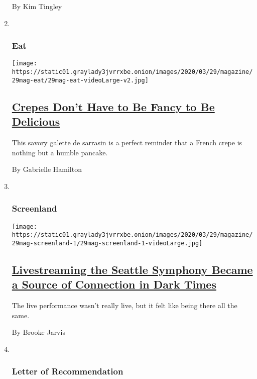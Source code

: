 \begin{enumerate}
  By Kim Tingley
\item ~
  \hypertarget{eat}{%
  \subsubsection{Eat}\label{eat}}

  \texttt{[image: https://static01.graylady3jvrrxbe.onion/images/2020/03/29/magazine/29mag-eat/29mag-eat-videoLarge-v2.jpg]}

  \hypertarget{crepes-dont-have-to-be-fancy-to-be-delicious}{%
  \subsection{\texorpdfstring{\href{/2020/03/25/magazine/crepes-dont-have-to-be-fancy-to-be-delicious.html}{Crepes
  Don't Have to Be Fancy to Be
  Delicious}}{Crepes Don't Have to Be Fancy to Be Delicious}}\label{crepes-dont-have-to-be-fancy-to-be-delicious}}

  This savory galette de sarrasin is a perfect reminder that a French
  crepe is nothing but a humble pancake.

  By Gabrielle Hamilton
\item ~
  \hypertarget{screenland}{%
  \subsubsection{Screenland}\label{screenland}}

  \texttt{[image: https://static01.graylady3jvrrxbe.onion/images/2020/03/29/magazine/29mag-screenland-1/29mag-screenland-1-videoLarge.jpg]}

  \hypertarget{livestreaming-the-seattle-symphony-became-a-source-of-connection-in-dark-times}{%
  \subsection{\texorpdfstring{\href{/2020/03/24/magazine/coronavirus-music-live-stream-concert.html}{Livestreaming
  the Seattle Symphony Became a Source of Connection in Dark
  Times}}{Livestreaming the Seattle Symphony Became a Source of Connection in Dark Times}}\label{livestreaming-the-seattle-symphony-became-a-source-of-connection-in-dark-times}}

  The live performance wasn't really live, but it felt like being there
  all the same.

  By Brooke Jarvis
\item ~
  \hypertarget{letter-of-recommendation}{%
  \subsubsection{Letter of
  Recommendation}\label{letter-of-recommendation}}


\end{enumerate}
